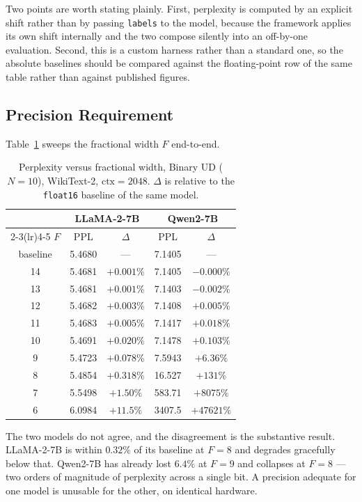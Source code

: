 Two points are worth stating plainly. First, perplexity is computed by an
explicit shift rather than by passing \texttt{labels} to the model, because
the framework applies its own shift internally and the two compose silently
into an off-by-one evaluation. Second, this is a custom harness rather than a
standard one, so the absolute baselines should be compared against the
floating-point row of the same table rather than against published figures.

\subsection{Precision Requirement}
\label{sec:precision}

Table~\ref{tab:fsweep} sweeps the fractional width $F$ end-to-end.

\begin{table}[t]
\caption{Perplexity versus fractional width, Binary UD ($N=10$),
WikiText-2, $\mathrm{ctx}=2048$. $\Delta$ is relative to the
\texttt{float16} baseline of the same model.}
\label{tab:fsweep}
\centering
\begin{tabular}{ccccc}
\toprule
& \multicolumn{2}{c}{LLaMA-2-7B} & \multicolumn{2}{c}{Qwen2-7B} \\
\cmidrule(lr){2-3}\cmidrule(lr){4-5}
$F$ & PPL & $\Delta$ & PPL & $\Delta$ \\
\midrule
baseline & 5.4680 & ---        & 7.1405  & --- \\
14       & 5.4681 & $+0.001\%$ & 7.1405  & $-0.000\%$ \\
13       & 5.4681 & $+0.001\%$ & 7.1403  & $-0.002\%$ \\
12       & 5.4682 & $+0.003\%$ & 7.1408  & $+0.005\%$ \\
11       & 5.4683 & $+0.005\%$ & 7.1417  & $+0.018\%$ \\
10       & 5.4691 & $+0.020\%$ & 7.1478  & $+0.103\%$ \\
9        & 5.4723 & $+0.078\%$ & 7.5943  & $+6.36\%$ \\
8        & 5.4854 & $+0.318\%$ & 16.527  & $+131\%$ \\
7        & 5.5498 & $+1.50\%$  & 583.71  & $+8075\%$ \\
6        & 6.0984 & $+11.5\%$  & 3407.5  & $+47621\%$ \\
\bottomrule
\end{tabular}
\end{table}

The two models do not agree, and the disagreement is the substantive result.
LLaMA-2-7B is within $0.32\%$ of its baseline at $F=8$ and degrades gracefully
below that. Qwen2-7B has already lost $6.4\%$ at $F=9$ and collapses at $F=8$
--- two orders of magnitude of perplexity across a single bit. A precision
adequate for one model is unusable for the other, on identical hardware.


